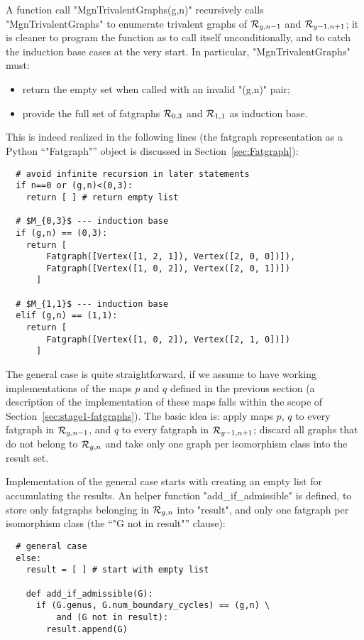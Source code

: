 A function call "MgnTrivalentGraphs(g,n)" recursively calls
"MgnTrivalentGraphs" to enumerate trivalent graphs of $\mathcal{R}_{g,n-1}$
and $\mathcal{R}_{g-1,n+1}$; it is cleaner to program the function as to call itself
unconditionally, and to catch the induction base cases at the very
start.  In particular, "MgnTrivalentGraphs" must:
\begin{itemize}
\item return the empty set when called with an invalid "(g,n)" pair;
\item provide the full set of fatgraphs $\mathcal{R}_{0,3}$ and $\mathcal{R}_{1,1}$ as
  induction base.
\end{itemize}
This is indeed realized in the following lines (the fatgraph
representation as a Python ``"Fatgraph"'' object is discussed in
Section~\ref{sec:Fatgraph}):
\begin{lstlisting}
  # avoid infinite recursion in later statements
  if n==0 or (g,n)<(0,3):
    return [ ] # return empty list

  # $M_{0,3}$ --- induction base
  if (g,n) == (0,3):
    return [ 
        Fatgraph([Vertex([1, 2, 1]), Vertex([2, 0, 0])]),
        Fatgraph([Vertex([1, 0, 2]), Vertex([2, 0, 1])]) 
      ]

  # $M_{1,1}$ --- induction base
  elif (g,n) == (1,1):
    return [ 
        Fatgraph([Vertex([1, 0, 2]), Vertex([2, 1, 0])]) 
      ]
\end{lstlisting}

The general case is quite straightforward, if we assume to have
working implementations of the maps $p$ and $q$ defined in the
previous section (a description of the implementation of these maps
falls within the scope of Section~\ref{sec:stage1-fatgraphs}).  The basic
idea is: apply maps $p$, $q$ to every fatgraph in $\mathcal{R}_{g,n-1}$, and
$q$ to every fatgraph in $\mathcal{R}_{g-1,n+1}$; discard all graphs that do
not belong to $\mathcal{R}_{g,n}$ and take only one graph per isomorphism class
into the result set.

Implementation of the general case starts with creating an empty list
for accumulating the results.  An helper function
"add_if_admissible" is defined, to store only fatgraphs belonging in
$\mathcal{R}_{g,n}$ into "result", and only one fatgraph per isomorphism
class (the ``"G not in result"'' clause):
\begin{lstlisting}
  # general case
  else:
    result = [ ] # start with empty list

    def add_if_admissible(G):
      if (G.genus, G.num_boundary_cycles) == (g,n) \
          and (G not in result):
        result.append(G)
      
\end{lstlisting}

